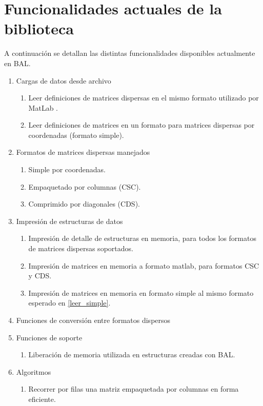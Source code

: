 \documentclass{cacic06}
\begin{document}
\section{Funcionalidades actuales de la biblioteca}
\label{sec_funcionalidad}
A continuación se detallan las distintas funcionalidades disponibles actualmente en BAL.
\begin{enumerate}
 \item Cargas de datos desde archivo
 \begin{enumerate}
  \item Leer definiciones de matrices dispersas en el mismo formato utilizado por MatLab \cite{matlab}.
  \item \label{leer_simple} Leer definiciones de matrices en un formato para matrices dispersas por coordenadas (formato simple). %
 \end{enumerate}
 \item Formatos de matrices dispersas manejados \cite{dongarra}
 \begin{enumerate}
  \item Simple por coordenadas.
  \item Empaquetado por columnas (CSC).
  \item Comprimido por diagonales (CDS).
 \end{enumerate}
 \item Impresión de estructuras de datos
 \begin{enumerate}
  \item Impresión de detalle de estructuras en memoria, para todos los formatos de matrices dispersas soportados.
  \item Impresión de matrices en memoria a formato matlab, para formatos CSC y CDS.
  \item Impresión de matrices en memoria en formato simple al mismo formato esperado en \ref{leer_simple}.
 \end{enumerate}
 \item Funciones de conversión entre formatos dispersos
 \item Funciones de soporte
 \begin{enumerate}
  \item Liberación de memoria utilizada en estructuras creadas con BAL.
 \end{enumerate}
 \item Algoritmos
 \begin{enumerate}
  \item Recorrer por filas una matriz empaquetada por columnas en forma eficiente.

\end{enumerate}
\end{enumerate}
\end{document}
